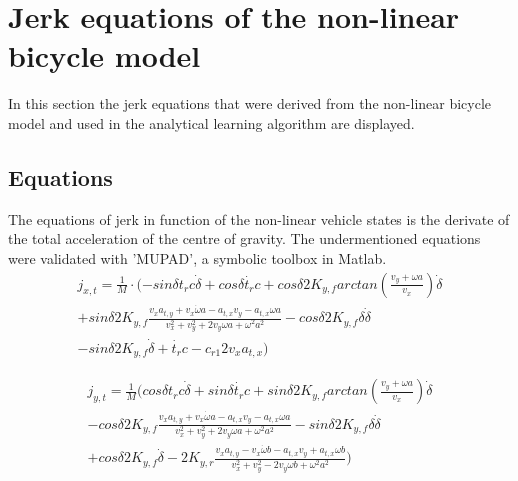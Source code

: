 \chapter{Jerk equations of the non-linear bicycle model}
\label{app:A}

In this section the jerk equations that were derived from the non-linear bicycle model and used in the analytical learning algorithm are displayed.
\section{Equations}
The equations of jerk in function of the non-linear vehicle states is the derivate of the total acceleration of the centre of gravity. The undermentioned equations were validated with 'MUPAD', a symbolic toolbox in Matlab.
\begin{multline*}
j_{x,t} = \frac{1}{M}\cdot (-sin\delta t_r c \dot{\delta}+ cos \delta\dot{t_r}c 
+ cos\delta 2 K_{y,f}arctan(\frac{v_y+\omega a}{v_x})\dot{\delta}\\ 
+ sin \delta 2 K_{y,f} \frac{v_x a_{t,y} + v_x \dot{\omega}a - a_{t,x}v_y -a_{t,x}\omega a}{v_x^2 +v_y^2 + 2v_y \omega a + \omega ^2 a^2 }
-cos \delta 2 K_{y,f}\delta \dot{\delta}\\
- sin\delta 2 K_{y,f} \dot{\delta} + \dot{t_r}c - c_{r1}2v_x a_{t,x})
\end{multline*}

\begin{multline*}
j_{y,t} = \frac{1}{M}(cos\delta t_r c \dot{\delta} + sin \delta \dot{t_r}c + sin\delta 2 K_{y,f}arctan(\frac{v_y+\omega a}{v_x})\dot{\delta}\\
-cos \delta 2 K_{y,f}\frac{v_x a_{t,y} + v_x \dot{\omega}a - a_{t,x}v_y -a_{t,x}\omega a}{v_x^2 +v_y^2 + 2v_y \omega a + \omega ^2 a^2 } - sin \delta 2 K_{y,f}\delta \dot{\delta}\\
 + cos\delta 2 K_{y,f}\dot{\delta} -2 K_{y,r} \frac{v_x a_{t,y} -v_x \dot{\omega}b - a_{t,x}v_y +a_{t,x}\omega b}{v_x^2 +v_y^2 - 2v_y \omega b + \omega ^2 a^2 })
\end{multline*}



%
%
%
%

